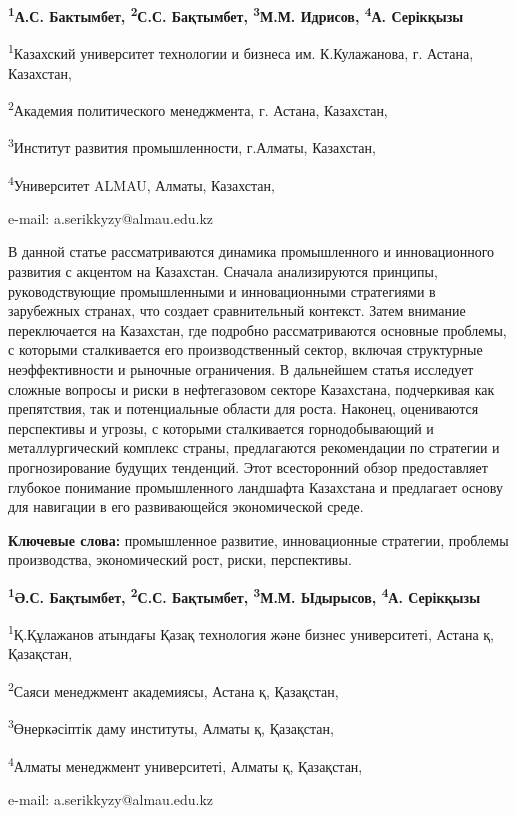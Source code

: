 \begin{center}
{\bfseries \textsuperscript{1}А.С. Бактымбет, \textsuperscript{2}С.С.
Бақтымбет, \textsuperscript{3}М.М. Идрисов, \textsuperscript{4}А. Серікқызы\envelope}

\textsuperscript{1}Казахский университет технологии и бизнеса им.
К.Кулажанова, г. Астана, Казахстан,

\textsuperscript{2}Академия политического менеджмента, г. Астана,
Казахстан,

\textsuperscript{3}Институт развития промышленности, г.Алматы,
Казахстан,

\textsuperscript{4}Университет ALMAU, Алматы, Казахстан,

e-mail: a.serikkyzy@almau.edu.kz
\end{center}

В данной статье рассматриваются динамика промышленного и инновационного
развития с акцентом на Казахстан. Сначала анализируются принципы,
руководствующие промышленными и инновационными стратегиями в зарубежных
странах, что создает сравнительный контекст. Затем внимание
переключается на Казахстан, где подробно рассматриваются основные
проблемы, с которыми сталкивается его производственный сектор, включая
структурные неэффективности и рыночные ограничения. В дальнейшем статья
исследует сложные вопросы и риски в нефтегазовом секторе Казахстана,
подчеркивая как препятствия, так и потенциальные области для роста.
Наконец, оцениваются перспективы и угрозы, с которыми сталкивается
горнодобывающий и металлургический комплекс страны, предлагаются
рекомендации по стратегии и прогнозирование будущих тенденций. Этот
всесторонний обзор предоставляет глубокое понимание промышленного
ландшафта Казахстана и предлагает основу для навигации в его
развивающейся экономической среде.

{\bfseries Ключевые слова:} промышленное развитие, инновационные стратегии,
проблемы производства, экономический рост, риски, перспективы.


\begin{center}
{\bfseries \textsuperscript{1}Ә.С. Бақтымбет, \textsuperscript{2}С.С.
Бақтымбет, \textsuperscript{3}М.М. Ыдырысов,
\textsuperscript{4}А. Серікқызы\envelope}

\textsuperscript{1}Қ.Құлажанов атындағы Қазақ технология және бизнес
университеті, Астана қ, Қазақстан,

\textsuperscript{2}Саяси менеджмент академиясы, Астана қ, Қазақстан,

\textsuperscript{3}Өнеркәсіптік даму институты, Алматы қ, Қазақстан,

\textsuperscript{4}Алматы менеджмент университеті, Алматы қ, Қазақстан,

e-mail: a.serikkyzy@almau.edu.kz
\end{center}

